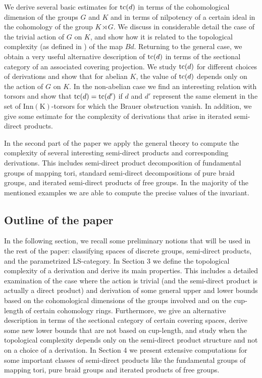 \documentclass[11pt]{amsart}
\theoremstyle{plain}
\theoremstyle{definition}
\newcommand{\tc}{\mathop{\rm tc}\nolimits}
\begin{document}
We derive several basic estimates for $\tc(d)$ in terms of the cohomological dimension of the 
groups $G$ and $K$ and in terms of nilpotency of  a certain ideal in the cohomology of the group
$K\rtimes G$. We discuss in considerable detail the case of the trivial action of $G$ on $K$, and show
how it is related to the topological complexity (as defined in \cite{Pavesic2017}) of the map $Bd$.
Returning to the general case, we obtain a very useful alternative description of $\tc(d)$
in terms of the sectional category of an associated covering projection. We study $\tc(d)$ for different
choices of derivations and show that for abelian $K$, the value of $\tc(d)$ depends only on the action
of $G$ on $K$. In the non-abelian case we find an interesting relation with torsors and show that 
$\tc(d)=\tc(d')$ if $d$ and $d'$ represent the same element in the 
set of $\operatorname{Inn(K)}$-torsors for which the Brauer obstruction vanish. In addition, we give 
some estimate for the complexity of derivations that arise in iterated semi-direct products.

In the second part of the paper we apply the general theory to compute the complexity of 
several interesting semi-direct products and corresponding derivations. This includes semi-direct
product decomposition of fundamental groups of mapping tori, standard semi-direct decompositions
of pure braid groups, and iterated semi-direct products of free groups. In the majority of the mentioned examples
we are able to compute the precise values of the invariant.

\subsection{Outline of the paper}
In the following section, we recall some preliminary notions that will be used in the rest of the paper: 
classifying spaces of discrete groups, semi-direct products, and the parametrized LS-category. 
In Section 3 we define the topological complexity of a derivation and derive its main properties.
This includes a detailed examination of the case where the action is trivial (and the semi-direct 
product is actually a direct product) and derivation of some general upper and lower bounds 
based on the cohomological dimensions of the groups involved and on the cup-length of 
certain cohomology rings. Furthermore, we give an alternative description in terms of 
the sectional category of certain covering spaces, derive some new lower bounds that are not based
on cup-length, and study when the topological complexity depends only on the semi-direct product
structure and not on a choice of a derivation. In Section 4 we present extensive computations 
for some important classes of semi-direct products like the fundamental groups of mapping tori, 
pure braid groups and iterated products of free groups.
\end{document}
